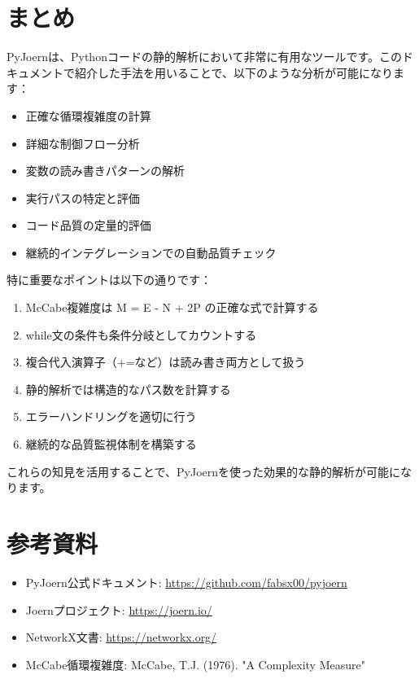 \documentclass[12pt,a4paper]{article}
\begin{document}
\section{まとめ}

PyJoernは、Pythonコードの静的解析において非常に有用なツールです。このドキュメントで紹介した手法を用いることで、以下のような分析が可能になります：

\begin{itemize}
    \item 正確な循環複雑度の計算
    \item 詳細な制御フロー分析
    \item 変数の読み書きパターンの解析
    \item 実行パスの特定と評価
    \item コード品質の定量的評価
    \item 継続的インテグレーションでの自動品質チェック
\end{itemize}

特に重要なポイントは以下の通りです：

\begin{enumerate}
    \item McCabe複雑度は M = E - N + 2P の正確な式で計算する
    \item while文の条件も条件分岐としてカウントする
    \item 複合代入演算子（+=など）は読み書き両方として扱う
    \item 静的解析では構造的なパス数を計算する
    \item エラーハンドリングを適切に行う
    \item 継続的な品質監視体制を構築する
\end{enumerate}

これらの知見を活用することで、PyJoernを使った効果的な静的解析が可能になります。

\section{参考資料}

\begin{itemize}
    \item PyJoern公式ドキュメント: \url{https://github.com/fabsx00/pyjoern}
    \item Joernプロジェクト: \url{https://joern.io/}
    \item NetworkX文書: \url{https://networkx.org/}
    \item McCabe循環複雑度: McCabe, T.J. (1976). "A Complexity Measure"
\end{itemize}
\end{document}
